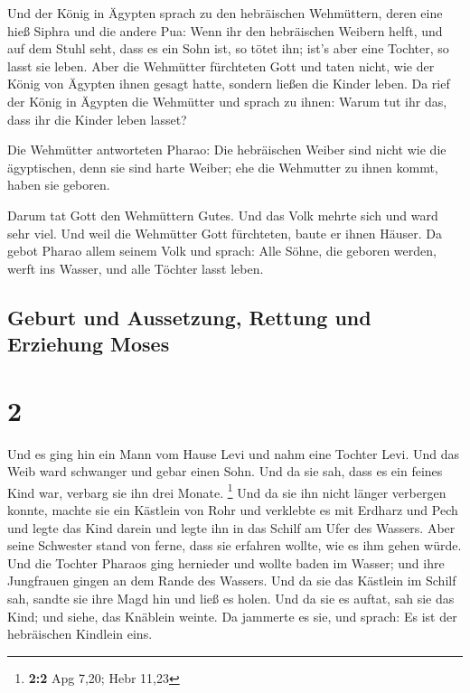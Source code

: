  Und der König in Ägypten sprach zu den hebräischen
Wehmüttern, deren eine hieß Siphra und die andere Pua: 
Wenn ihr den hebräischen Weibern helft, und auf dem Stuhl seht, dass es
ein Sohn ist, so tötet ihn; ist's aber eine Tochter, so lasst sie leben.
 Aber die Wehmütter fürchteten Gott und taten nicht, wie
der König von Ägypten ihnen gesagt hatte, sondern ließen die Kinder
leben.  Da rief der König in Ägypten die Wehmütter und
sprach zu ihnen: Warum tut ihr das, dass ihr die Kinder leben lasset?

 Die Wehmütter antworteten Pharao: Die hebräischen Weiber
sind nicht wie die ägyptischen, denn sie sind harte Weiber; ehe die
Wehmutter zu ihnen kommt, haben sie geboren.

 Darum tat Gott den Wehmüttern Gutes. Und das Volk mehrte
sich und ward sehr viel.  Und weil die Wehmütter Gott
fürchteten, baute er ihnen Häuser.  Da gebot Pharao allem
seinem Volk und sprach: Alle Söhne, die geboren werden, werft ins
Wasser, und alle Töchter lasst leben.

\hypertarget{geburt-und-aussetzung-rettung-und-erziehung-moses}{%
\subsection{Geburt und Aussetzung, Rettung und Erziehung
Moses}\label{geburt-und-aussetzung-rettung-und-erziehung-moses}}

\hypertarget{section-1}{%
\section{2}\label{section-1}}

 Und es ging hin ein Mann vom Hause Levi und nahm eine
Tochter Levi.  Und das Weib ward schwanger und gebar einen
Sohn. Und da sie sah, dass es ein feines Kind war, verbarg sie ihn drei
Monate. \footnote{\textbf{2:2} Apg 7,20; Hebr 11,23}  Und
da sie ihn nicht länger verbergen konnte, machte sie ein Kästlein von
Rohr und verklebte es mit Erdharz und Pech und legte das Kind darein und
legte ihn in das Schilf am Ufer des Wassers.  Aber seine
Schwester stand von ferne, dass sie erfahren wollte, wie es ihm gehen
würde.  Und die Tochter Pharaos ging hernieder und wollte
baden im Wasser; und ihre Jungfrauen gingen an dem Rande des Wassers.
Und da sie das Kästlein im Schilf sah, sandte sie ihre Magd hin und ließ
es holen.  Und da sie es auftat, sah sie das Kind; und
siehe, das Knäblein weinte. Da jammerte es sie, und sprach: Es ist der
hebräischen Kindlein eins.

